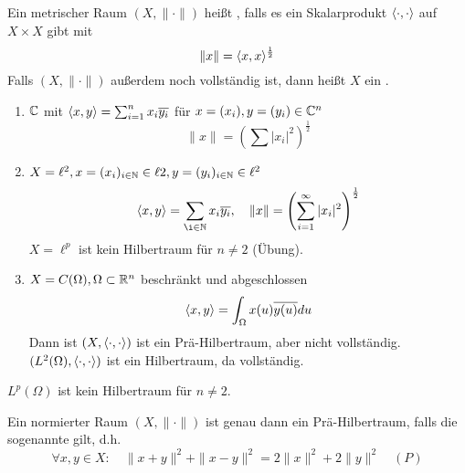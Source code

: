 \begin{definition}
	Ein metrischer Raum $(X, \| \cdot \|)$ hei{\ss}t , falls es ein Skalarprodukt $\langle \cdot, \cdot \rangle$ auf $X \times X$ gibt mit
		\[ \| x \| = \langle x, x \rangle^{\frac{1}{2}} \]
	Falls $(X, \| \cdot \|)$ au{\ss}erdem noch vollständig ist, dann hei{\ss}t $X$ ein .	
\end{definition}


\begin{beispiel}
	\begin{enumerate}[label=\alph*\upshape)]
		\item $\mathbb{C}$ mit $\langle x, y \rangle = \sum_{i = 1}^{n} x_{i} \overline{y_{i}}$ für $x = (x_{i}), y = (y_{i}) \in \mathbb{C}^{n}$ \\
			\[ \| x \| = \left( \sum | x_{i}|^{2} \right)^{\frac{1}{2}} \]
		\item $X = \ell^{2}, x = (x_{i})_{i \in \mathbb{N}} \in \ell{2}, y = (y_{i})_{i \in \mathbb{N}} \in \ell^{2}$ \\
			\[ \< x, y \> = \sum_{\i \in \MdN} x_{i} \overline{y_{i}},  \quad \|x \| = \left( \sum_{i = 1}^{\infty} |x_{i}|^{2} \right)^{\frac{1}{2}} \]
			$X = \ell^{p}$ ist kein Hilbertraum für $n \neq 2$ (Übung).
		\item $X = C(\Omega), \Omega \subset \mathbb{R}^{n}$ beschränkt und abgeschlossen \\
			\[ \langle x, y \rangle = \int_{\Omega} x(u) \overline{y(u)} du \]
			Dann ist $(X, \langle \cdot, \cdot \rangle)$ ist ein Prä-Hilbertraum, aber nicht vollständig. \\
			$(L^{2}(\Omega), \langle \cdot, \cdot \rangle)$ ist ein Hilbertraum, da vollständig.
	\end{enumerate}	
\end{beispiel}


\begin{bemerkung*}
	$L^{p}(\Omega)$ ist kein Hilbertraum für $n \neq 2$.
\end{bemerkung*}


\begin{satz} \label{satz:15.6}
	Ein normierter Raum $(X, \| \cdot \|)$ ist genau dann ein Prä-Hilbertraum, falls die sogenannte  gilt, d.h.
	\[ \forall x, y \in X: \quad \|x + y \|^{2} + \| x - y \|^{2} = 2 \| x \|^{2} + 2 \| y \|^{2} \quad (P) \label{eq:15.6-rallelogrammGleichung} \]
\end{satz}

